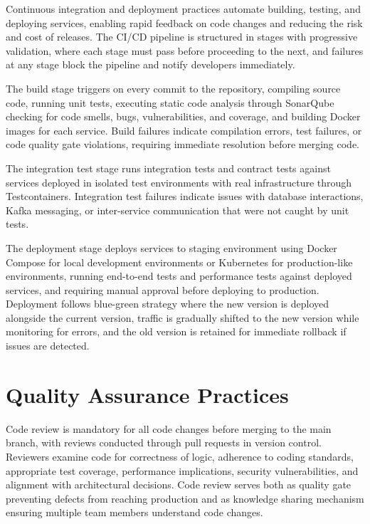 Continuous integration and deployment practices automate building, testing, and deploying services, enabling rapid feedback on code changes and reducing the risk and cost of releases. The CI/CD pipeline is structured in stages with progressive validation, where each stage must pass before proceeding to the next, and failures at any stage block the pipeline and notify developers immediately.

The build stage triggers on every commit to the repository, compiling source code, running unit tests, executing static code analysis through SonarQube checking for code smells, bugs, vulnerabilities, and coverage, and building Docker images for each service. Build failures indicate compilation errors, test failures, or code quality gate violations, requiring immediate resolution before merging code.

The integration test stage runs integration tests and contract tests against services deployed in isolated test environments with real infrastructure through Testcontainers. Integration test failures indicate issues with database interactions, Kafka messaging, or inter-service communication that were not caught by unit tests.

The deployment stage deploys services to staging environment using Docker Compose for local development environments or Kubernetes for production-like environments, running end-to-end tests and performance tests against deployed services, and requiring manual approval before deploying to production. Deployment follows blue-green strategy where the new version is deployed alongside the current version, traffic is gradually shifted to the new version while monitoring for errors, and the old version is retained for immediate rollback if issues are detected.

\section{Quality Assurance Practices}

Code review is mandatory for all code changes before merging to the main branch, with reviews conducted through pull requests in version control. Reviewers examine code for correctness of logic, adherence to coding standards, appropriate test coverage, performance implications, security vulnerabilities, and alignment with architectural decisions. Code review serves both as quality gate preventing defects from reaching production and as knowledge sharing mechanism ensuring multiple team members understand code changes.

